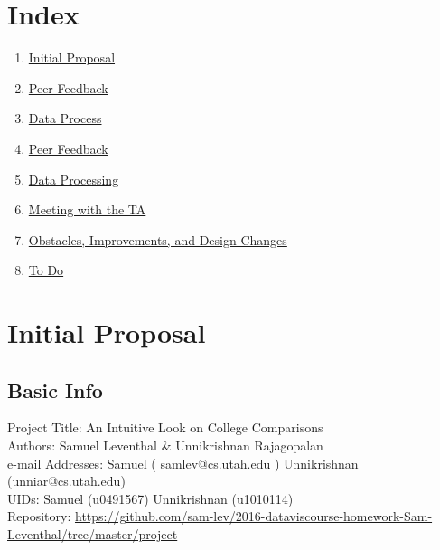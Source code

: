 \documentclass[11pt, a4paper]{article}
\begin{document}
\fi

\section{Index}
\begin{enumerate}
\item \href{sec:Initial Proposal}{Initial Proposal}
\item \href{sec:Peer Feedback}{Peer Feedback}
\item \href{sec:Data Process}{Data Process}
\item \href{sec:Peer Feedback}{Peer Feedback}
\item \href{sec:Data Processing}{Data Processing}
\item \href{sec:Meeting with the TA}{Meeting with the TA}
\item \href{sec:Obstacles, Improvements, and Design Changes}{Obstacles, Improvements, and Design Changes}
\item \href{sec:To Do}{To Do} 
\end{enumerate}


\section{Initial Proposal}
\subsection{Basic Info}
Project Title: An Intuitive Look on College Comparisons\\
Authors: Samuel Leventhal \& Unnikrishnan Rajagopalan\\
e-mail Addresses: Samuel ( samlev@cs.utah.edu ) Unnikrishnan (unniar@cs.utah.edu)\\
UIDs: Samuel (u0491567) Unnikrishnan (u1010114)\\
Repository: \href{https://github.com/sam-lev/2016-dataviscourse-homework-Sam-Leventhal/tree/master/project}{https://github.com/sam-lev/2016-dataviscourse-homework-Sam-Leventhal/tree/master/project}
\end{document}
